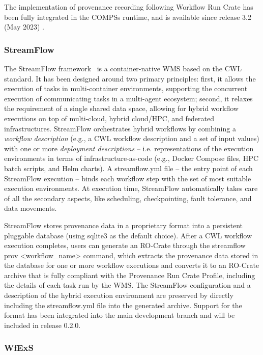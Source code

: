 The implementation of provenance recording following Workflow Run Crate has been fully integrated in the COMPSs runtime, and is available since release 3.2 (May 2023) .


\subsubsection{StreamFlow}\label{ch54:streamflow}

The StreamFlow framework~\cite{Colonnelli 2020} is a container-native WMS based on the CWL standard.
It has been designed around two primary principles: first, it allows the execution of tasks in multi-container environments, supporting the concurrent execution of communicating tasks in a multi-agent ecosystem; second, it relaxes the requirement of a single shared data space, allowing for hybrid workflow executions on top of multi-cloud, hybrid cloud/HPC, and federated infrastructures.
StreamFlow orchestrates hybrid workflows by combining a \emph{workflow description} (e.g., a CWL workflow description and a set of input values) with one or more \emph{deployment descriptions} -- i.e.
representations of the execution environments in terms of infrastructure-as-code (e.g., Docker Compose files, HPC batch scripts, and Helm charts).
A streamflow.yml file -- the entry point of each StreamFlow execution -- binds each workflow step with the set of most suitable execution environments.
At execution time, StreamFlow automatically takes care of all the secondary aspects, like scheduling, checkpointing, fault tolerance, and data movements.

StreamFlow stores provenance data in a proprietary format into a persistent pluggable database (using sqlite3 as the default choice).
After a CWL workflow execution completes, users can generate an RO-Crate through the streamflow prov \textless workflow\_name\textgreater{}
command, which extracts the provenance data stored in the database for one or more workflow executions and converts it to an RO-Crate archive that is fully compliant with the Provenance Run Crate Profile, including the details of each task run by the WMS.
The StreamFlow configuration and a description of the hybrid execution environment are preserved by directly including the streamflow.yml file into the generated archive.
Support for the format has been integrated into the main development branch and will be included in release 0.2.0.

\subsubsection{WfExS}\label{ch54:wfexs}

